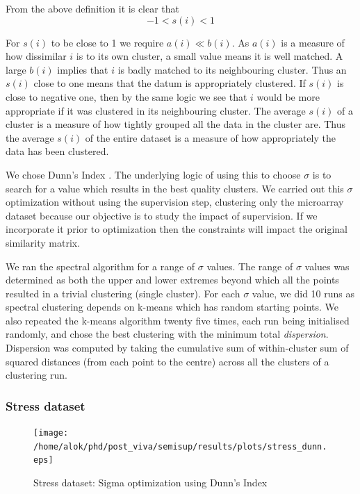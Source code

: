 From the above definition it is clear that
\[
-1<s(i)<1 
\]

For $s(i)$ to be close to 1 we require $a(i) \ll b(i)$. As $a(i)$ is a measure of how dissimilar $i$ is to its own cluster, a small value means it is well matched. 
A large $b(i)$ implies that $i$ is badly matched to its neighbouring cluster. Thus an $s(i)$ close to one means that the datum is appropriately clustered. If $s(i)$ is close to 
negative one, then by the same logic we see that $i$ would be more appropriate if it was clustered in its neighbouring cluster. The average $s(i)$ of a cluster is a measure of how tightly grouped all the 
data in the cluster are. Thus the average $s(i)$ of the entire dataset is a measure of how appropriately the data has been clustered. 

We chose Dunn's Index \citep{Dunn1974wellseparated}. 
The underlying logic of using this to choose $\sigma$ is to search for a value which results in the best quality clusters. 
We carried out this $\sigma$ optimization without using the supervision step, clustering only the microarray dataset because our objective is to study the impact of supervision. 
If we incorporate it prior to optimization then the constraints will impact the original similarity matrix.

We ran the spectral algorithm for a range of $\sigma$ values. The range of $\sigma$ values was determined as both the upper and lower extremes beyond which all the points 
resulted in a trivial clustering (single cluster).  For each $\sigma$ value, we did 10 runs as spectral clustering depends on k-means which has random starting points. 
We also repeated the k-means algorithm twenty five times, each run being initialised randomly, and chose the best clustering with the minimum total \textit{dispersion}. 
Dispersion was computed by taking the cumulative sum of within-cluster sum of squared distances (from each point to the centre) across all the clusters of a clustering run.  

\subsubsection{Stress dataset}

\begin{figure}[tp]
 \centering
 \texttt{[image: /home/alok/phd/post\_viva/semisup/results/plots/stress\_dunn.eps]}
 \caption{Stress dataset: Sigma optimization using Dunn's Index}
 \label{fig:stress_sigma_opt_dunn}
\end{figure}

